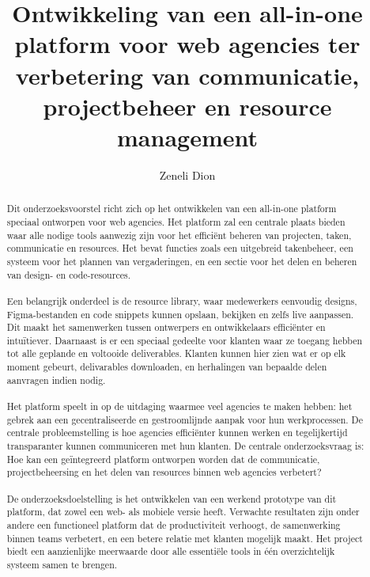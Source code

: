 \documentclass{hogent-article}
\title{Ontwikkeling van een all-in-one platform voor web agencies ter verbetering van communicatie, projectbeheer en resource management}
\author{Zeneli Dion}
\begin{document}
    
    \begin{abstract}
      Dit onderzoeksvoorstel richt zich op het ontwikkelen van een all-in-one platform speciaal ontworpen voor web agencies. Het platform zal een centrale plaats bieden waar alle nodige tools aanwezig zijn voor het efficiënt beheren van projecten, taken, communicatie en resources. Het bevat functies zoals een uitgebreid takenbeheer, een systeem voor het plannen van vergaderingen, en een sectie voor het delen en beheren van design- en code-resources.
      \\
      \\
      Een belangrijk onderdeel is de resource library, waar medewerkers eenvoudig designs, Figma-bestanden en code snippets kunnen opslaan, bekijken en zelfs live aanpassen. Dit maakt het samenwerken tussen ontwerpers en ontwikkelaars efficiënter en intuïtiever. Daarnaast is er een speciaal gedeelte voor klanten waar ze toegang hebben tot alle geplande en voltooide deliverables. Klanten kunnen hier zien wat er op elk moment gebeurt, delivarables downloaden, en herhalingen van bepaalde delen aanvragen indien nodig.
      \\
      \\
      Het platform speelt in op de uitdaging waarmee veel agencies te maken hebben: het gebrek aan een gecentraliseerde en gestroomlijnde aanpak voor hun werkprocessen. De centrale probleemstelling is hoe agencies efficiënter kunnen werken en tegelijkertijd transparanter kunnen communiceren met hun klanten. De centrale onderzoeksvraag is: Hoe kan een geïntegreerd platform ontworpen worden dat de communicatie, projectbeheersing en het delen van resources binnen web agencies verbetert?
      \\
      \\
      De onderzoeksdoelstelling is het ontwikkelen van een werkend prototype van dit platform, dat zowel een web- als mobiele versie heeft. Verwachte resultaten zijn onder andere een functioneel platform dat de productiviteit verhoogt, de samenwerking binnen teams verbetert, en een betere relatie met klanten mogelijk maakt. Het project biedt een aanzienlijke meerwaarde door alle essentiële tools in één overzichtelijk systeem samen te brengen.
    \end{abstract}
    
    \tableofcontents
    
    
    
    \printbibliography[heading=bibintoc]
    
\end{document}

